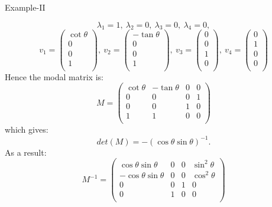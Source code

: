 \documentclass{beamer}
\begin{document}
\begin{frame}{Example-II}
\begin{scriptsize}
\begin{equation*}
\lambda_1=1,\:  \lambda_2=0,\:  \lambda_3=0,\:  \lambda_4=0, 
\end{equation*}
\begin{equation*}
v_1=\left(
\begin{array}{c}
 \cot \theta \\
 0\\
 0\\
 1 \\
\end{array}
\right),
\:  v_2=\left(
\begin{array}{c}
 -\tan \theta \\
 0\\
 0\\
 1 \\
\end{array}
\right),
\:  v_3= \left(
\begin{array}{c}
 0 \\
 0\\
 1\\
 0 \\
\end{array}
\right),\:  v_4= 
\left(
\begin{array}{c}
 0 \\
 1\\
 0\\
 0 \\
\end{array}
\right)
\end{equation*}
Hence the modal matrix is:
\begin{equation*}
M=\left(
\begin{array}{cccc}
 \cot \theta  & -\tan \theta  & 0 & 0 \\
 0 & 0 & 0 & 1 \\
 0 & 0 & 1 & 0 \\
 1 & 1 & 0 & 0 \\
\end{array}
\right)
\end{equation*}
which gives:
\begin{equation*}
det(M)=-(\cos \theta \sin \theta )^{-1}.
\end{equation*}
As a result:
\begin{equation*}
M^{-1}=
\left(
\begin{array}{cccc}
  \cos  \theta  \sin \theta  & 0 & 0 &  \sin ^2 \theta  \\
 - \cos   \theta  \sin  \theta  & 0 & 0 & \cos ^2 \theta  \\
 0 & 0 & 1 & 0 \\
 0 & 1 & 0 & 0 \\
\end{array}
\right)
\end{equation*}
\end{scriptsize}
\end{frame}
\end{document}
